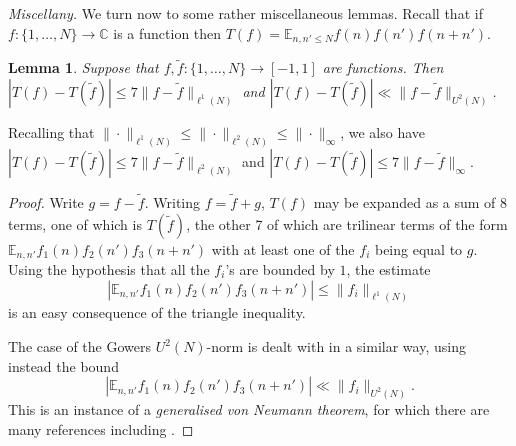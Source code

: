 \documentclass[10pt,reqno]{amsart}
\newtheorem{lemma}[theorem]{Lemma}
\theoremstyle{definition}
\theoremstyle{remark}
\newcommand{\mdlem}[1]{\ensuremath{(\mbox{\textup{mod}}\, #1)}}
\renewcommand{\leq}{\leqslant}
\def\C{\mathbb{C}}
\def\E{\mathbb{E}}
\def\eps{\varepsilon}
\numberwithin{equation}{section}
\begin{document}
%

\emph{Miscellany.} We turn now to some rather miscellaneous lemmas. Recall that if $f : \{1,\dots,N\}\to\C$ is a function then $T(f) = \E_{n,n' \leq N} f(n) f(n') f(n + n')$.

\begin{lemma}\label{lem-a9} Suppose that $f, \tilde f : \{1,\dots, N\} \to [-1,1]$ are functions. Then $|T(f)-T(\tilde{f})| \leq 7\|f-\tilde{f}\|_{\ell^1(N)}$ and $|T(f) - T(\tilde{f})| \ll \| f - \tilde{f} \|_{U^2(N)}$.\end{lemma}

Recalling that $\|\cdot\|_{\ell^1(N)}\leq\|\cdot\|_{\ell^2(N)}\leq\|\cdot\|_{\infty}$, we also have $|T(f)-T(\tilde{f})|\leq 7\|f-\tilde{f}\|_{\ell^2(N)}$ and $|T(f)-T(\tilde{f})|\leq 7\|f-\tilde{f}\|_\infty$.

\begin{proof}
Write $g = f - \tilde{f}$. Writing $f = \tilde{f} + g$, $T(f)$ may be expanded as a sum of $8$ terms, one of which is $T(\tilde f)$, the other 7 of which are trilinear terms of the form $\E_{n,n'} f_1(n) f_2(n') f_3(n + n')$ with at least one of the $f_i$ being equal to $g$. Using the hypothesis that all the $f_i$'s are bounded by $1$, the estimate
\[ | \E_{n, n'} f_1(n) f_2(n') f_3(n + n')| \leq \| f_i \|_{\ell^1(N)}\] is an easy consequence of the triangle inequality.

The case of the Gowers $U^2(N)$-norm is dealt with in a similar way, using instead the bound
\[ |\E_{n,n'} f_1(n) f_2(n') f_3(n + n')| \ll \| f_i \|_{U^2(N)}.\] This is an instance of a \emph{generalised von Neumann theorem}, for which there are many references including \cite[Lemma 11.4]{tv}.\end{proof}
\end{document}

